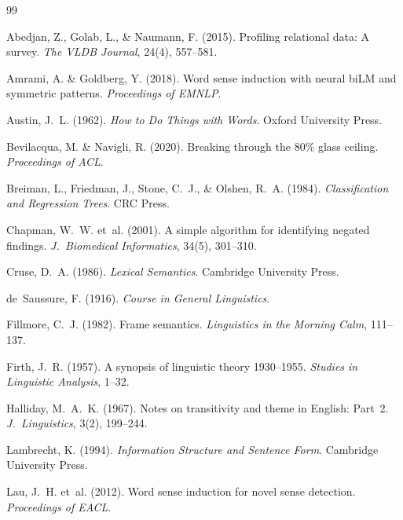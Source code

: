 \documentclass[11pt,a4paper]{article}
\begin{document}

\begin{thebibliography}{99}

Abedjan, Z., Golab, L., \& Naumann, F. (2015).
Profiling relational data: A survey.
\emph{The VLDB Journal}, 24(4), 557--581.

Amrami, A. \& Goldberg, Y. (2018).
Word sense induction with neural biLM and symmetric patterns.
\emph{Proceedings of EMNLP}.

Austin, J.~L. (1962).
\emph{How to Do Things with Words}. Oxford University Press.

Bevilacqua, M. \& Navigli, R. (2020).
Breaking through the 80\% glass ceiling.
\emph{Proceedings of ACL}.

Breiman, L., Friedman, J., Stone, C.~J., \& Olshen, R.~A. (1984).
\emph{Classification and Regression Trees}. CRC Press.

Chapman, W.~W. et~al. (2001).
A simple algorithm for identifying negated findings.
\emph{J.\ Biomedical Informatics}, 34(5), 301--310.

Cruse, D.~A. (1986).
\emph{Lexical Semantics}. Cambridge University Press.

de~Saussure, F. (1916).
\emph{Course in General Linguistics}.

Fillmore, C.~J. (1982).
Frame semantics.
\emph{Linguistics in the Morning Calm}, 111--137.

Firth, J.~R. (1957).
A synopsis of linguistic theory 1930--1955.
\emph{Studies in Linguistic Analysis}, 1--32.

Halliday, M.~A.~K. (1967).
Notes on transitivity and theme in English: Part~2.
\emph{J.\ Linguistics}, 3(2), 199--244.

Lambrecht, K. (1994).
\emph{Information Structure and Sentence Form}. Cambridge University Press.

Lau, J.~H. et~al. (2012).
Word sense induction for novel sense detection.
\emph{Proceedings of EACL}.


\end{thebibliography}
\end{document}
